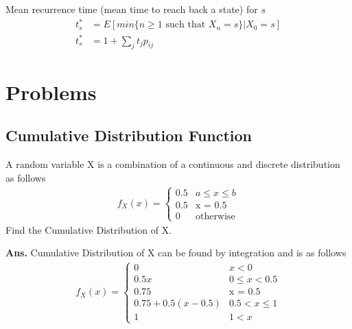 \documentclass[11pt, a4paper]{article}
\begin{document}
    Mean recurrence time (mean time to reach back a state) for $s$
    \begin{align*}
        t_{s}^{*} &= E[min\{n \geq 1 \text{ such that } X_{n}=s\} | X_{0} = s] \\
        t_{s}^{*} &= 1 + \sum_{j} t_{j} p_{ij}
    \end{align*}

    \section{Problems}
    \subsection{Cumulative Distribution Function}
    A random variable X is a combination of a continuous and discrete distribution as follows
    \begin{align*}
        f_{X}(x) = \begin{cases} 0.5 &\mbox{$a \leq x \leq b$}\\
                                 0.5 &\mbox{x = 0.5}\\
                                 0 &\mbox{otherwise} \end{cases}
    \end{align*}
    Find the Cumulative Distribution of X.\newline \newline
    
    \textbf{Ans.} Cumulative Distribution of X can be found by integration and is as follows
    \begin{align*}
        f_{X}(x) = \begin{cases} 0 &\mbox{$x < 0$}\\
                                 0.5x &\mbox{$0 \leq x < 0.5$}\\
                                 0.75 &\mbox{x = 0.5}\\
                                 0.75 + 0.5(x-0.5) &\mbox{$0.5 < x \leq 1$} \\
                                 1 &\mbox {$1 < x$}\end{cases}
    \end{align*}

\end{document}
